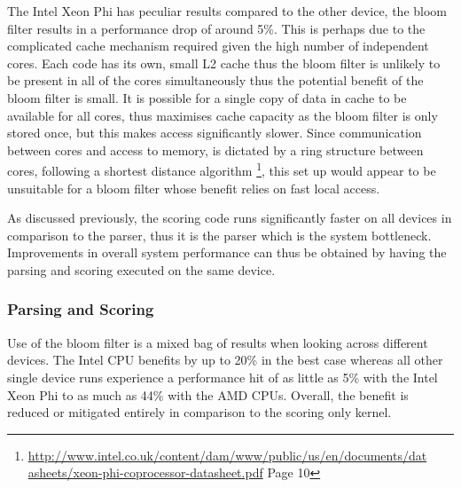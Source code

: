 The Intel Xeon Phi has peculiar results compared to the other device, the bloom
filter results in a performance drop of around 5\%. This is perhaps due to the
complicated cache mechanism required given the high number of independent cores.
Each code has its own, small L2 cache thus the bloom filter is unlikely to be
present in all of the cores simultaneously thus the potential benefit of the
bloom filter is small. It is possible for a single copy of data in cache to be
available for all cores, thus maximises cache capacity as the bloom filter is
only stored once, but this makes access significantly slower. Since
communication between cores and access to memory, is dictated by a ring
structure between cores, following a shortest distance algorithm
\footnote{\url{http://www.intel.co.uk/content/dam/www/public/us/en/documents/dat
asheets/xeon-phi-coprocessor-datasheet.pdf} Page 10}, this set up would appear
to be unsuitable for a bloom filter whose benefit relies on fast local access.

As discussed previously, the scoring code runs significantly faster on all
devices in comparison to the parser, thus it is the parser which is the system
bottleneck. Improvements in overall system performance can thus be obtained by
having the parsing and scoring executed on the same device.

\subsubsection{Parsing and Scoring}

Use of the bloom filter is a mixed bag of results when looking across different
devices. The Intel CPU benefits by up to 20\% in the best case whereas all other
single device runs experience a performance hit of as little as 5\% with the
Intel Xeon Phi to as much as 44\% with the AMD CPUs. Overall, the benefit is
reduced or mitigated entirely in comparison to the scoring only kernel.

